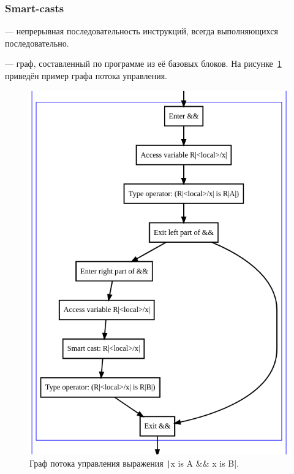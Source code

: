\subsubsection{Smart-casts}\label{subsubsec:smart-casts}

\begin{definition}
    \label{def:basic-block}
     --- непрерывная последовательность инструкций, всегда выполняющихся последовательно.
\end{definition}

\begin{definition}
    \label{def:cfg}
     --- граф, составленный по программе из её базовых блоков.
    На рисунке~\ref{fig:cfg-example} приведён пример графа потока управления.
\end{definition}

\begin{figure}
    \centering
    \includegraphics[width=0.8\linewidth]{fig/cfgExample}
    \caption{Граф потока управления выражения \texttt|x is A && x is B|.}
    \label{fig:cfg-example}
\end{figure}

